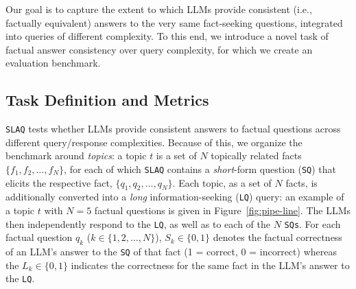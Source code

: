 \documentclass[11pt]{article}
\newcommand{\acrnm}{\texttt{SLAQ}\xspace}
\begin{document}
Our goal is to capture the extent to which LLMs provide consistent (i.e., factually equivalent) answers to the very same fact-seeking questions, integrated into queries of different complexity. To this end, we introduce a novel task of factual answer consistency over query complexity, for which we create an evaluation benchmark.      

\subsection{Task Definition and Metrics} \acrnm tests whether LLMs provide consistent answers to factual questions across different query/response complexities. Because of this, we organize the benchmark around \textit{topics}: a topic $t$ is a set of $N$ topically related facts $\{f_1, f_2, \dots, f_N\}$, for each of which \acrnm contains a \textit{short}-form question (\texttt{SQ}) that elicits the respective fact, $\{q_1, q_2, \dots, q_N\}$. Each topic, as a set of $N$ facts, is additionally converted into a \textit{long} information-seeking (\texttt{LQ}) query: an example of a topic $t$ with $N=5$ factual questions is given in Figure~\ref{fig:pipe-line}. The LLMs then independently respond to the \texttt{LQ}, as well as to each of the $N$ \texttt{SQs}. 
%
For each factual question $q_k$ ($k \in \{1, 2, \dots, N\}$), $S_k \in \{0, 1\}$ denotes the factual correctness of an LLM's answer to the \texttt{SQ} of that fact (1 = correct, 0 = incorrect) whereas the $L_k \in \{0, 1\}$ indicates the correctness for the same fact in the LLM's answer to the \texttt{LQ}. 
\end{document}
